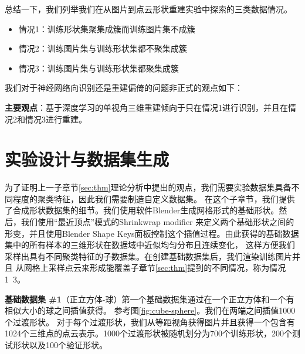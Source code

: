 \documentclass[bachelor, nocolorlinks, printoneside]{seuthesis} %
\begin{document}
\begin{Main}
总结一下，我们列举我们在从图片到点云形状重建实验中探索的三类数据情况。
\label{sec:case}
\begin{itemize}
    \item 情况1\label{sec:case1}：训练形状集聚集成簇而训练图片集不成簇
    \item 情况2\label{sec:case2}：训练图片集与训练形状集都不聚集成簇
    \item 情况3\label{sec:case3}：训练图片集与训练形状集都聚集成簇
\end{itemize}

我们对于神经网络向识别还是重建偏倚的问题非正式的观点如下：

\textbf{主要观点}：基于深度学习的单视角三维重建倾向于只在情况1进行识别，并且在情况2和情况3进行重建。


\section{实验设计与数据集生成}\label{sec:dataset}

为了证明上一子章节\ref{sec:thm}理论分析中提出的观点，我们需要实验数据集具备不同程度的聚类特征，因此我们需要制造自定义数据集。
在这个子章节，我们提供了合成形状数据集的细节。我们使用软件Blender生成网格形式的基础形状。然后，我们使用“最近顶点”模式的Shrinkwrap
modifier 来定义两个基础形状之间的形变，并且使用Blender Shape Keys面板控制这个插值过程。由此获得的基础数据集中的所有样本的三维形状在数据域中近似均匀分布且连续变化，
这样方便我们采样出具有不同聚类特征的子数据集。在创建基础数据集后，我们渲染训练图片并且
从网格上采样点云来形成能覆盖子章节\ref{sec:thm}提到的不同情况，称为情况1~3。

\textbf{基础数据集 \#1}（正立方体-球）第一个基础数据集通过在一个正立方体和一个有相似大小的球之间插值获得。
参考图\ref{fig:cube-sphere}。我们在两端之间插值1000个过渡形状。 对于每个过渡形状，我们从等距视角获得图片并且获得一个包含有
1024个三维点的点云表示。1000个过渡形状被随机划分为700个训练形状，200个测试形状以及100个验证形状。



\end{Main}
\end{document}
